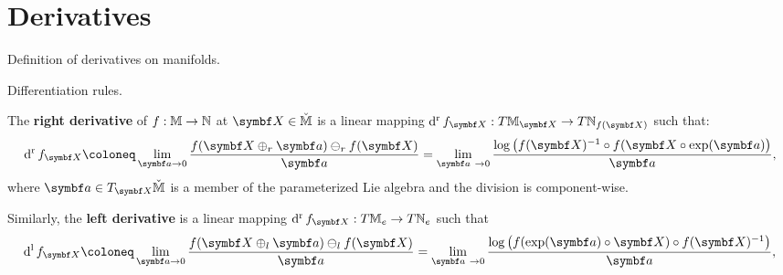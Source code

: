 
\chapter{Derivatives}

\begin{itemize_outcomes}
  \item Definition of derivatives on manifolds.
  \item Differentiation rules.
\end{itemize_outcomes}


\begin{definition}
  The \textbf{right derivative} of $f : {\mathbb{M}} \rightarrow {\mathbb{N}}$ at $\X \in {\cM}$ is a linear mapping $\dr f_\X : T {\M}_{\X} \rightarrow T \N_{f(\X)}$ such that:
  \begin{equation}
    \label{eq:deriv_rght}
    \dr f_\X \coloneq \lim_{\a \rightarrow 0} \frac{f( \X \oplus_r\a) \ominus_r f(\X)}{\a} = \lim_{\a\ \rightarrow 0} \frac{\log \left( f(\X)^{-1} \circ  f(\X \circ \exp(\a) \right)}{\a},
  \end{equation}
  where $\a \in T_\X \check{\M}$ is a member of the parameterized Lie algebra and the division is component-wise.

  Similarly, the \textbf{left derivative} is a linear mapping $\dr f_\X : T {\M}_{e} \rightarrow T \N_{e}$ such that
  \begin{equation}
    \label{eq:deriv_left}
    \dl f_\X \coloneq \lim_{\a \rightarrow 0} \frac{f( \X \oplus_l \a) \ominus_l  f(\X)}{\a} = \lim_{\a\ \rightarrow 0} \frac{\log \left( f(\exp(\a) \circ \X) \circ f(\X)^{-1} \right)}{\a},
  \end{equation}
\end{definition}

